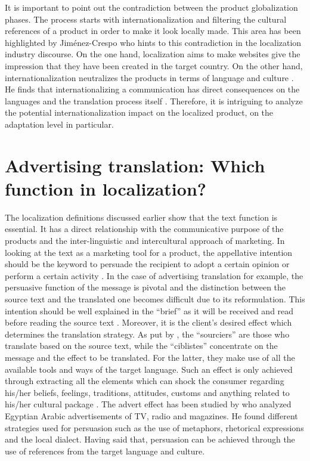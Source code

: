 \documentclass[output=paper]{langsci/langscibook}
\begin{document}
It is important to point out the contradiction between the product globalization phases. The process starts with internationalization and filtering the cultural references of a product in order to make it look locally made. This area has been highlighted by Jiménez-Crespo who hints to this contradiction in the localization industry discourse. On the one hand, localization aims to make websites give the impression that they have been created in the target country. On the other hand, internationalization neutralizes the products in terms of language and culture \parencite{jimenez10}. He finds that internationalizing a communication has direct consequences on the languages and the translation process itself \parencite[10]{jimenez13}. Therefore, it is intriguing to analyze the potential internationalization impact on the localized product, on the adaptation level in particular.

\section{Advertising translation: Which function in localization?}

The localization definitions discussed earlier show that the text function is essential. It has a direct relationship with the communicative purpose of the products and the inter-linguistic and intercultural approach of marketing. In looking at the text as a marketing tool for a product, the appellative intention should be the keyword to persuade the recipient to adopt a certain opinion or perform a certain activity \parencites{nord05}[cf.][]{tatilon90}{boivineau72}. In the case of advertising translation for example, the persuasive function of the message is pivotal and the distinction between the source text and the translated one becomes difficult \parencite{cruz18} due to its reformulation. This intention should be well explained in the \enquote{brief} as it will be received and read before reading the source text \parencite{nord05}. Moreover, it is the client’s desired effect which determines the translation strategy. As put by \textcite[76]{ladmiral14}, the \enquote{sourciers} are those who translate based on the source text, while the \enquote{ciblistes} concentrate on the message and the effect to be translated. For the latter, they make use of all the available tools and ways of the target language. Such an effect is only achieved through extracting all the elements which can shock the consumer regarding his/her beliefs, feelings, traditions, attitudes, customs and anything related to his/her cultural package \parencite{tatilon90}. The advert effect has been studied by \textcite{gully96} who analyzed Egyptian Arabic advertisements of TV, radio and magazines. He found different strategies used for persuasion such as the use of metaphors, rhetorical expressions and the local dialect. Having said that, persuasion can be achieved through the use of references from the target language and culture.
\end{document}
